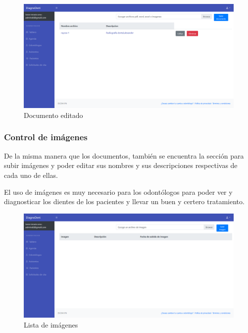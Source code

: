 \begin{figure}[H]
\centering
\includegraphics[width=17cm,keepaspectratio]{pictures/adminodo/pacientes/documentos/lista-documentos-editado.png}
\caption{Documento editado}
\end{figure}






\subsubsection{Control de imágenes}

De la misma manera que los documentos, también se encuentra la sección para subir imágenes y poder editar sus nombres y sus descripciones respectivas de cada uno de ellas.

\vspace{1em}

El uso de imágenes es muy necesario para los odontólogos para poder ver y diagnosticar los dientes de los pacientes y llevar un buen y certero tratamiento.

\begin{figure}[H]
\centering
\includegraphics[width=17cm,keepaspectratio]{pictures/adminodo/pacientes/imagenes/lista-imagenes.png}
\caption{Lista de imágenes}
\end{figure}

